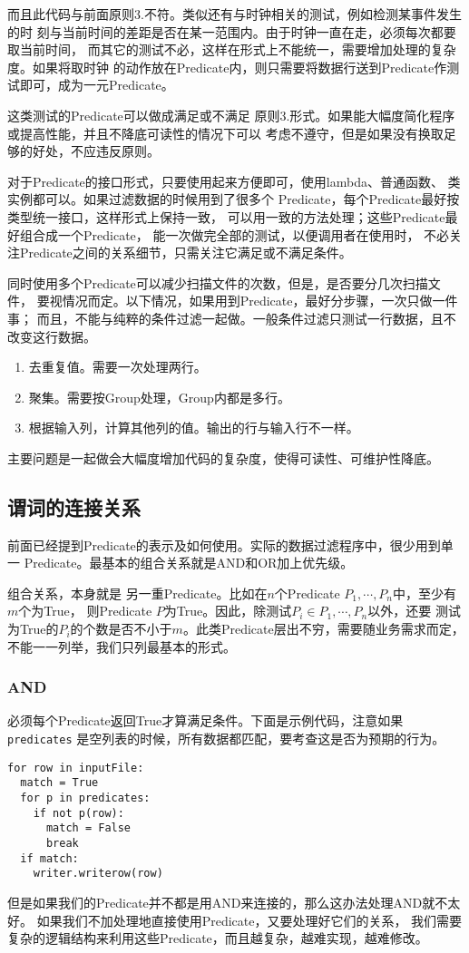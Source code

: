 \documentclass[11pt]{article}
\newcommand{\id}[1]{\texttt{#1}}
\begin{document}
而且此代码与前面原则3.不符。类似还有与时钟相关的测试，例如检测某事件发生的时
刻与当前时间的差距是否在某一范围内。由于时钟一直在走，必须每次都要取当前时间，
而其它的测试不必，这样在形式上不能统一，需要增加处理的复杂度。如果将取时钟
的动作放在Predicate内，则只需要将数据行送到Predicate作测试即可，成为一元Predicate。

这类测试的Predicate可以做成满足或不满足
原则3.形式。如果能大幅度简化程序或提高性能，并且不降底可读性的情况下可以
考虑不遵守，但是如果没有换取足够的好处，不应违反原则。

对于Predicate的接口形式，只要使用起来方便即可，使用lambda、普通函数、
类实例都可以。如果过滤数据的时候用到了很多个
Predicate，每个Predicate最好按类型统一接口，这样形式上保持一致，
可以用一致的方法处理；这些Predicate最好组合成一个Predicate，
能一次做完全部的测试，以便调用者在使用时，
不必关注Predicate之间的关系细节，只需关注它满足或不满足条件。

同时使用多个Predicate可以减少扫描文件的次数，但是，是否要分几次扫描文件，
要视情况而定。以下情况，如果用到Predicate，最好分步骤，一次只做一件事；
而且，不能与纯粹的条件过滤一起做。一般条件过滤只测试一行数据，且不改变这行数据。

\begin{enumerate}
  \item 去重复值。需要一次处理两行。
  \item 聚集。需要按Group处理，Group内都是多行。
  \item 根据输入列，计算其他列的值。输出的行与输入行不一样。
\end{enumerate}

主要问题是一起做会大幅度增加代码的复杂度，使得可读性、可维护性降底。


\subsection{谓词的连接关系}
前面已经提到Predicate的表示及如何使用。实际的数据过滤程序中，很少用到单一
Predicate。最基本的组合关系就是AND和OR加上优先级。

组合关系，本身就是
另一重Predicate。比如在$n$个Predicate $P_1, \cdots, P_n$中，至少有$m$个为True，
则Predicate $P$为True。因此，除测试$P_i \in {P_1, \cdots, P_n}$以外，还要
测试为True的$P_i$的个数是否不小于$m$。此类Predicate层出不穷，需要随业务需求而定，
不能一一列举，我们只列最基本的形式。

\subsubsection{AND}
必须每个Predicate返回True才算满足条件。下面是示例代码，注意如果\id{predicates}
是空列表的时候，所有数据都匹配，要考查这是否为预期的行为。
\begin{lstlisting}
for row in inputFile:
  match = True
  for p in predicates:
    if not p(row):
      match = False
      break
  if match:
    writer.writerow(row)
\end{lstlisting}
但是如果我们的Predicate并不都是用AND来连接的，那么这办法处理AND就不太好。
如果我们不加处理地直接使用Predicate，又要处理好它们的关系，
我们需要复杂的逻辑结构来利用这些Predicate，而且越复杂，越难实现，越难修改。
\end{document}
